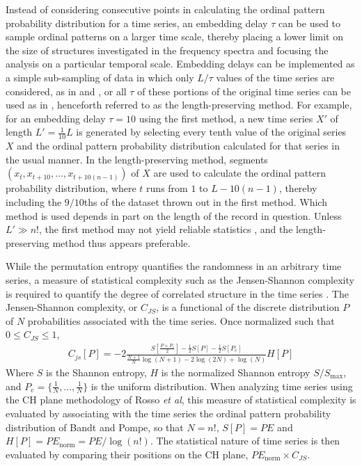 \documentclass[aps,pre,twocolumn,secnumarabic,nobalancelastpage,amsmath,amssymb,
nofootinbib]{revtex4-1}
\begin{document}
Instead of considering consecutive points in calculating the ordinal pattern probability distribution for a time series, an embedding delay $\tau$ can be used to sample ordinal patterns on a larger time scale, thereby placing a lower limit on the size of structures investigated in the frequency spectra and focusing the analysis on a particular temporal scale. Embedding delays can be implemented as a simple sub-sampling of data in which only $L/\tau$ values of the time series are considered, as in \cite{maggs2013} and \cite{gekelman2014}, or all $\tau$ of these portions of the original time series can be used as in \cite{bandt2005}, henceforth referred to as the length-preserving method. For example, for an embedding delay $\tau=10$ using the first method, a new time series $X'$ of length $L'=\frac{1}{10}L$ is generated by selecting every tenth value of the original series $X$ and the ordinal pattern probability distribution calculated for that series in the usual manner. In the  length-preserving method, segments $ ( x_t,x_{t+10},\ldots,x_{t+10(n-1)} ) $ of $X$ are used to calculate the ordinal pattern probability distribution, where $t$ runs from $1$ to $L-10(n-1)$, thereby including the $9/10$ths of the dataset thrown out in the first method. Which method is used depends in part on the length of the record in question. Unless  $L' \gg n!$, the first method may not yield reliable statistics \cite{gekelman2014}, and the length-preserving method thus appears preferable.


While the permutation entropy quantifies the randomness in an arbitrary time series, a measure of statistical complexity such as the Jensen-Shannon complexity is required to quantify the degree of correlated structure in the time series \cite{rosso2007}. The Jensen-Shannon complexity, or $C_{JS}$, is a functional of the discrete distribution $P$ of $N$ probabilities associated with the time series. Once normalized such that $0 \leq C_{JS} \leq 1$, 
\begin{align}
C_{js}[P] = -2\frac{S \left[ \frac{P+P_e}{2} \right] - \frac{1}{2}S[P]-\frac{1}{2}S[P_e] }{\frac{N+1}{N} \log(N+1)-2 \log(2N)+\log(N)}H[P]
\end{align}
Where $S$ is the Shannon entropy, $H$ is the normalized Shannon entropy $S/S_{\text{max}}$, and $P_e=\{\frac{1}{N}, \ldots, \frac{1}{N} \}$ is the uniform distribution. When analyzing time series using the CH plane methodology of Rosso \textit{et al}, this measure of statistical complexity is evaluated by associating with the time series the ordinal pattern probability distribution of Bandt and Pompe, so that $N=n!$, $S[P]=PE$ and $H[P]=PE_{\text{norm}}=PE/\log(n!)$. The statistical nature of time series is then evaluated by comparing their positions on the CH plane, $PE_{\text{norm}} \times C_{JS}$.
\end{document}
